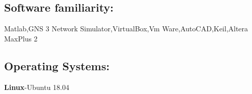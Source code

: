 \documentclass{article}
\begin{document}
\subsection*{Software familiarity:}
Matlab,GNS 3 Network Simulator,VirtualBox,Vm Ware,AutoCAD,Keil,Altera MaxPlus 2

\subsection*{Operating Systems:}
\textbf{ Linux}-Ubuntu 18.04
\end{document}
